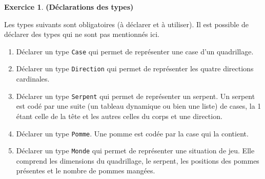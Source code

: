 \documentclass[11pt]{article}
\theoremstyle{definition}
\newtheorem{Exercice}{Exercice}
\begin{document}
\begin{Exercice} {\bf (Déclarations des types)}\smallskip

Les types suivants sont obligatoires (à déclarer et à utiliser). Il
est possible de déclarer des types qui ne sont pas mentionnés ici.
\smallskip

\begin{enumerate}
    \item Déclarer un type {\tt Case} qui permet de représenter une
    case d'un quadrillage.
    \smallskip

    \item Déclarer un type {\tt Direction} qui permet de représenter
    les quatre directions cardinales.
    \smallskip

    \item Déclarer un type {\tt Serpent} qui permet de représenter un
    serpent. Un serpent est codé par une suite (un tableau dynamique ou
    bien une liste) de cases, la 1\iere{} étant celle de la tête et les
    autres celles du corps et une direction.
    \smallskip

    \item Déclarer un type {\tt Pomme}. Une pomme est codée par la
    case qui la contient.
    \smallskip

    \item Déclarer un type {\tt Monde} qui permet de représenter une
    situation de jeu. Elle comprend les dimensions du quadrillage, le
    serpent, les positions des pommes présentes et le nombre de pommes
    mangées.
\end{enumerate}
\end{Exercice}
\bigskip
\end{document}
